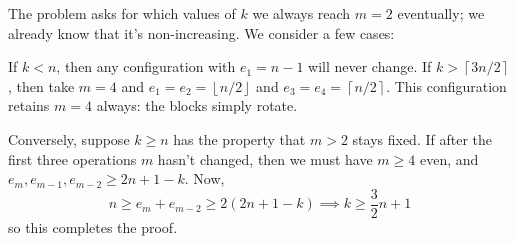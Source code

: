 The problem asks for which values of $k$ we always reach $m=2$ eventually;
we already know that it's non-increasing.
We consider a few cases:
\begin{itemize}
  \ii If $k < n$, then any configuration with $e_1 = n-1$ will never change.
  \ii If $k > \left\lceil 3n/2 \right\rceil$,
  then take $m=4$ and $e_1 = e_2 = \left\lfloor n/2 \right\rfloor$
  and $e_3 = e_4 = \left\lceil n/2 \right\rceil$.
  This configuration retains $m=4$ always:
  the blocks simply rotate.

  \ii Conversely, suppose $k \ge n$ has the property that $m > 2$ stays fixed.
  If after the first three operations $m$ hasn't changed,
  then we must have $m \ge 4$ even, and $e_m, e_{m-1}, e_{m-2} \ge 2n+1 - k$.
  Now,
  \[ n \ge e_m + e_{m-2} \ge 2(2n+1-k) \implies k \ge \frac 32 n + 1 \]
  so this completes the proof.
\end{itemize}
